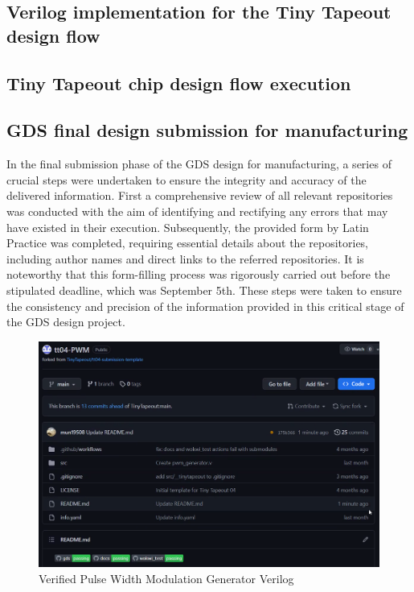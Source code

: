 \subsection{Verilog implementation for the Tiny Tapeout design flow}

\subsection{Tiny Tapeout chip design flow execution}

\subsection{GDS final design submission for manufacturing}
In the final submission phase of the GDS design for manufacturing, a series of crucial steps were undertaken to ensure the integrity and accuracy of the delivered information. First a comprehensive review of all relevant repositories was conducted with the aim of identifying and rectifying any errors that may have existed in their execution. Subsequently, the provided form by Latin Practice was completed, requiring essential details about the repositories, including author names and direct links to the referred repositories. It is noteworthy that this form-filling process was rigorously carried out before the stipulated deadline, which was September 5th. These steps were taken to ensure the consistency and precision of the information provided in this critical stage of the GDS design project.

\begin{figure}[H]
    \centering
    \includegraphics[width=\linewidth]{Pictures/pwm_verified.png}
    \caption{Verified Pulse Width Modulation Generator Verilog }
    \label{fig:enter-label}
\end{figure}

